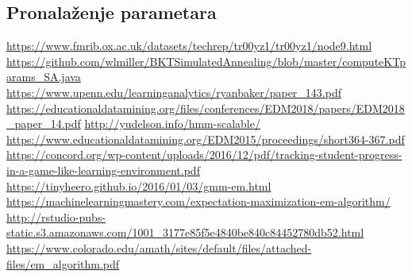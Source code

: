 \subsection{Pronalaženje parametara}
\url{https://www.fmrib.ox.ac.uk/datasets/techrep/tr00yz1/tr00yz1/node9.html}\newline
\url{https://github.com/wlmiller/BKTSimulatedAnnealing/blob/master/computeKTparams_SA.java}\newline
\url{https://www.upenn.edu/learninganalytics/ryanbaker/paper_143.pdf}\newline
\url{https://educationaldatamining.org/files/conferences/EDM2018/papers/EDM2018_paper_14.pdf}\newline
\url{http://yudelson.info/hmm-scalable/}\newline
\url{https://www.educationaldatamining.org/EDM2015/proceedings/short364-367.pdf}\newline
\url{https://concord.org/wp-content/uploads/2016/12/pdf/tracking-student-progress-in-a-game-like-learning-environment.pdf}\newline
\url{https://tinyheero.github.io/2016/01/03/gmm-em.html}\newline
\url{https://machinelearningmastery.com/expectation-maximization-em-algorithm/}\newline
\url{http://rstudio-pubs-static.s3.amazonaws.com/1001_3177e85f5e4840be840c84452780db52.html}\newline
\url{https://www.colorado.edu/amath/sites/default/files/attached-files/em_algorithm.pdf}